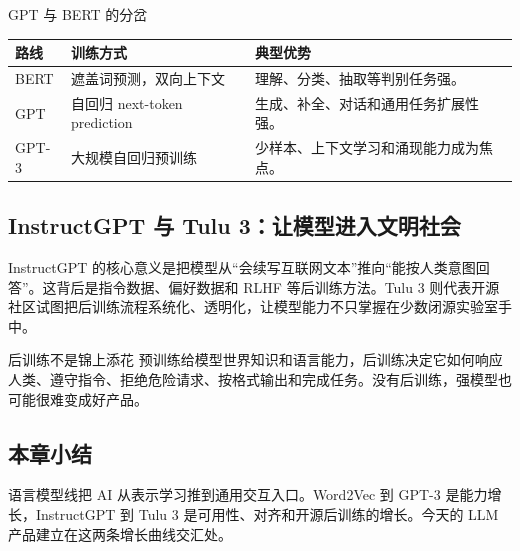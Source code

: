 \begin{knowledgebox}{GPT 与 BERT 的分岔}
\begin{tabularx}{\textwidth}{p{}p{}X}
\toprule
路线 & 训练方式 & 典型优势 \\
\midrule
BERT & 遮盖词预测，双向上下文 & 理解、分类、抽取等判别任务强。 \\
GPT & 自回归 next-token prediction & 生成、补全、对话和通用任务扩展性强。 \\
GPT-3 & 大规模自回归预训练 & 少样本、上下文学习和涌现能力成为焦点。 \\
\bottomrule
\end{tabularx}
\end{knowledgebox}

\subsection{InstructGPT 与 Tulu 3：让模型进入文明社会}

InstructGPT 的核心意义是把模型从“会续写互联网文本”推向“能按人类意图回答”。这背后是指令数据、偏好数据和 RLHF 等后训练方法。Tulu 3 则代表开源社区试图把后训练流程系统化、透明化，让模型能力不只掌握在少数闭源实验室手中。

\begin{warningbox}{后训练不是锦上添花}
预训练给模型世界知识和语言能力，后训练决定它如何响应人类、遵守指令、拒绝危险请求、按格式输出和完成任务。没有后训练，强模型也可能很难变成好产品。
\end{warningbox}

\subsection{本章小结}

语言模型线把 AI 从表示学习推到通用交互入口。Word2Vec 到 GPT-3 是能力增长，InstructGPT 到 Tulu 3 是可用性、对齐和开源后训练的增长。今天的 LLM 产品建立在这两条增长曲线交汇处。

